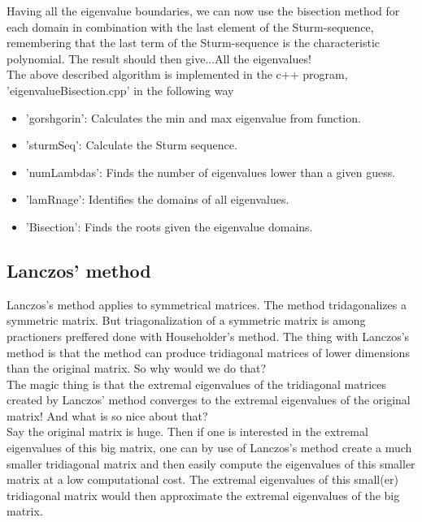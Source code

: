 \documentclass{article}
\begin{document}
Having all the eigenvalue boundaries, we can now use the bisection method for each domain in combination with the last element of the Sturm-sequence, remembering that the last term of the Sturm-sequence is the characteristic polynomial. The result should then give...All the eigenvalues!\\

The above described algorithm is implemented in the c++ program, 'eigenvalueBisection.cpp' in the following way

\begin{itemize}
	\item  'gorshgorin': Calculates the min and max eigenvalue from function.
	
	\item 'sturmSeq': Calculate the Sturm sequence.
	
	\item 'numLambdas': Finds the number of eigenvalues lower than a given guess.
	
	\item 'lamRnage': Identifies the domains of all eigenvalues.
	
	\item 'Bisection': Finds the roots given the eigenvalue domains.
	
\end{itemize}

\subsection{Lanczos' method}
Lanczos's method applies to symmetrical matrices. The method tridagonalizes a symmetric matrix. But triagonalization of a symmetric matrix is among practioners preffered done with Householder's method. The thing with Lanczos's method is that the method can produce tridiagonal matrices of lower dimensions than the original matrix. So why would we do that? \\

The magic thing is that the extremal eigenvalues of the tridiagonal matrices created by Lanczos' method converges to the extremal eigenvalues of the original matrix! And what is so nice about that?\\

Say the original matrix is huge. Then if one is interested in the extremal eigenvalues of this big matrix, one can by use of Lanczos's method create a much smaller tridiagonal matrix and then easily compute the eigenvalues of this smaller matrix at a low computational cost. The extremal eigenvalues of this small(er) tridiagonal matrix would then approximate the extremal eigenvalues of the big matrix.\\
\end{document}
